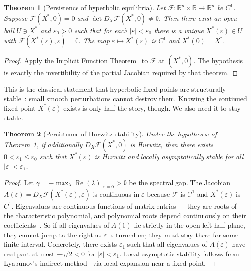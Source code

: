 \documentclass[11pt]{article}
\newtheorem{theorem}{Theorem}
\begin{document}
\begin{theorem}[Persistence of hyperbolic equilibria]
  \label{thm:general_persistence}
  Let $\mathcal{F}:\mathbb{R}^n\times\mathbb{R}\to\mathbb{R}^n$ be $C^1$.
  Suppose $\mathcal{F}(X^*,0)=0$ and $\det D_X\mathcal{F}(X^*,0)\neq 0$.
  Then there exist an open ball $U\ni X^*$ and $\varepsilon_0>0$ such
  that for each $|\varepsilon|<\varepsilon_0$ there is a unique
  $X^*(\varepsilon)\in U$ with $\mathcal{F}(X^*(\varepsilon),\varepsilon)=0$.
  The map $\varepsilon\mapsto X^*(\varepsilon)$ is $C^1$ and $X^*(0)=X^*$.
\end{theorem}

\begin{proof}
  Apply the Implicit Function Theorem~\cite{rudin1976,lang1993} to
  $\mathcal{F}$ at $(X^*,0)$. The hypothesis is exactly the invertibility
  of the partial Jacobian required by that theorem.
\end{proof}

This is the classical statement that hyperbolic fixed points are
structurally stable~\cite{hirsch2013,wiggins2003}: small smooth
perturbations cannot destroy them. Knowing the continued fixed point
$X^*(\varepsilon)$ exists is only half the story, though. We also need
it to stay stable.

\begin{theorem}[Persistence of Hurwitz stability]
  \label{thm:general_hurwitz}
  Under the hypotheses of Theorem~\ref{thm:general_persistence}, if
  additionally $D_X\mathcal{F}(X^*,0)$ is Hurwitz, then there exists
  $0<\varepsilon_1\leq\varepsilon_0$ such that $X^*(\varepsilon)$ is
  Hurwitz and locally asymptotically stable for all
  $|\varepsilon|<\varepsilon_1$.
\end{theorem}

\begin{proof}
  Let $\gamma = -\max_\lambda\operatorname{Re}(\lambda)|_{\varepsilon=0}>0$
  be the spectral gap. The Jacobian $A(\varepsilon) =
  D_X\mathcal{F}(X^*(\varepsilon),\varepsilon)$ is continuous in
  $\varepsilon$ because $\mathcal{F}$ is $C^1$ and $X^*(\varepsilon)$ is
  $C^1$. Eigenvalues are continuous functions of matrix entries --- they
  are roots of the characteristic polynomial, and polynomial roots
  depend continuously on their coefficients~\cite{horn2013}. So if all
  eigenvalues of $A(0)$ lie strictly in the open left half-plane, they
  cannot jump to the right as $\varepsilon$ is turned on; they must stay
  there for some finite interval. Concretely, there exists
  $\varepsilon_1$ such that all eigenvalues of $A(\varepsilon)$ have
  real part at most $-\gamma/2 < 0$ for $|\varepsilon| < \varepsilon_1$.
  Local asymptotic stability follows from Lyapunov's indirect
  method~\cite{khalil2002} via local expansion near a fixed point.
\end{proof}
\end{document}
